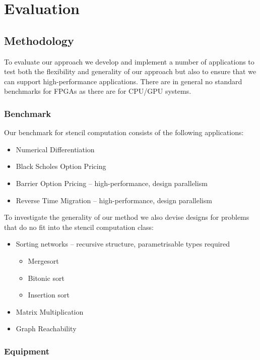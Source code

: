 \chapter{Evaluation}
\label{sec:evaluation}

\section{Methodology}

To evaluate our approach we develop and implement a number of applications
to test both the flexibility and generality of our approach but also to
ensure that we can support high-performance applications. There are in general
no standard benchmarks for FPGAs as there are for CPU/GPU  systems.

\subsection{Benchmark}
\label{sec:bechmark}
Our benchmark for stencil computation consists of the following
applications:
\begin{itemize}
\item Numerical Differentiation
\item Black Scholes Option Pricing
\item Barrier Option Pricing -- high-performance, design parallelism
\item Reverse Time Migration -- high-performance, design parallelism
\end{itemize}

To investigate the generality of our method we also devise designs for
problems that do no fit into the stencil computation class:

\begin{itemize}
\item Sorting networks -- recursive structure, parametrisable types
  required
  \begin{itemize}
  \item Mergesort
  \item Bitonic sort
  \item Insertion sort
  \end{itemize}
\item Matrix Multiplication
\item Graph Reachability
\end{itemize}

\subsection{Equipment}

